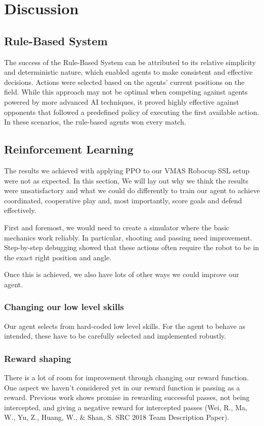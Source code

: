 \section{Discussion}
\label{section:disc}

\subsection{Rule-Based System}
The success of the Rule-Based System can be attributed to its relative simplicity and deterministic nature, which enabled agents to make consistent and effective decisions. Actions were selected based on the agents’ current positions on the field. While this approach may not be optimal when competing against agents powered by more advanced AI techniques, it proved highly effective against opponents that followed a predefined policy of executing the first available action. In these scenarios, the rule-based agents won every match.

\subsection{Reinforcement Learning}
The results we achieved with applying PPO to our VMAS Robocup SSL setup were not as expected.
In this section, We will lay out why we think the results were unsatisfactory and what we could do differently to train our agent to achieve coordinated, cooperative play and, most importantly, score goals and defend effectively.

First and foremost, we would need to create a simulator where the basic mechanics work reliably. In particular, shooting and passing need improvement. Step-by-step debugging showed that these actions often require the robot to be in the exact right position and angle.

Once this is achieved, we also have lots of other ways we could improve our agent.

\subsubsection{Changing our low level skills}
Our agent selects from hard-coded low level skills. For the agent to behave as intended, these have to be carefully selected and implemented robustly.

\subsubsection{Reward shaping}
There is a lot of room for improvement through changing our reward function.
One aspect we haven't considered yet in our reward function is passing as a reward.
Previous work shows promise in rewarding successful passes, not being intercepted, and giving a negative reward for intercepted passes
(Wei, R., Ma, W., Yu, Z., Huang, W., \& Shan, S. SRC 2018 Team Description Paper).


